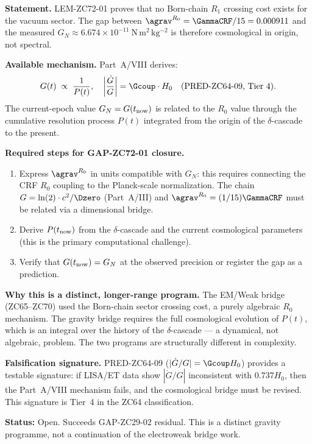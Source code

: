 \documentclass[12pt, a4paper]{article}
\begin{document}
\begin{openqbox}[title={GAP-ZC72-01: Cosmological Bridge
  $\agrav^{R_0} \to G_N(t_{\rm now})$ (Open; Priority~1 for
  Gravity Programme)}]

\textbf{Statement.}
LEM-ZC72-01 proves that no Born-chain $R_1$ crossing cost
exists for the vacuum sector.
The gap between $\agrav^{R_0} = \GammaCRF/15 = 0.000911$ and
the measured $G_N \approx 6.674\times10^{-11}\ \mathrm{N\,m^2\,kg^{-2}}$
is therefore cosmological in origin, not spectral.

\textbf{Available mechanism.}
Part~A/VIII derives:
\[
  G(t) \;\propto\; \frac{1}{P(t)},
  \quad
  \left|\frac{\dot{G}}{G}\right| = \Gcoup \cdot H_0
  \quad\text{(PRED-ZC64-09, Tier~4)}.
\]
The current-epoch value $G_N = G(t_{\rm now})$ is related to
the $R_0$ value through the cumulative resolution process $P(t)$
integrated from the origin of the $\delta$-cascade to the present.

\textbf{Required steps for GAP-ZC72-01 closure.}
\begin{enumerate}[leftmargin=2em, noitemsep]
  \item Express $\agrav^{R_0}$ in units compatible with $G_N$:
    this requires connecting the CRF $R_0$ coupling to the
    Planck-scale normalization. The chain
    $G = \ln(2)\cdot c^2/\Dzero$ (Part~A/III) and
    $\agrav^{R_0} = (1/15)\GammaCRF$ must be related via a
    dimensional bridge.
  \item Derive $P(t_{\rm now})$ from the $\delta$-cascade
    and the current cosmological parameters (this is
    the primary computational challenge).
  \item Verify that $G(t_{\rm now}) = G_N$ at the observed
    precision or register the gap as a prediction.
\end{enumerate}

\textbf{Why this is a distinct, longer-range program.}
The EM/Weak bridge (ZC65--ZC70) used the Born-chain sector
crossing cost, a purely algebraic $R_0$ mechanism.
The gravity bridge requires the full cosmological evolution
of $P(t)$, which is an integral over the history of the
$\delta$-cascade --- a dynamical, not algebraic, problem.
The two programs are structurally different in complexity.

\textbf{Falsification signature.}
PRED-ZC64-09 ($|\dot{G}/G| = \Gcoup H_0$) provides a
testable signature: if LISA/ET data show $|\dot{G}/G|$
inconsistent with $0.737 H_0$, then the Part~A/VIII
mechanism fails, and the cosmological bridge must be revised.
This signature is Tier~4 in the ZC64 classification.

\textbf{Status:} Open. Succeeds GAP-ZC29-02 residual.
This is a distinct gravity programme, not a continuation
of the electroweak bridge work.
\end{openqbox}
\end{document}
